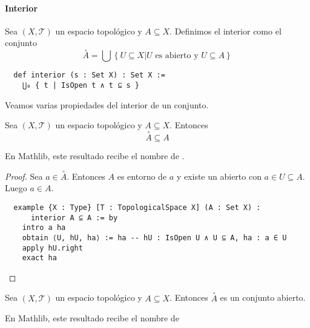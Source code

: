 \paragraph{Interior}

\begin{definition}
    Sea $(X, \mathcal{T})$ un espacio topológico y $A \subseteq X$. Definimos el \textnormal{interior} como el conjunto
    $$
    \overset{\circ}{A} = \bigcup \left\{ U \subseteq X | U \text{ es abierto y } U \subseteq A \right\}
    $$
\end{definition}

\begin{lstlisting}
  def interior (s : Set X) : Set X :=
    ⋃₀ { t | IsOpen t ∧ t ⊆ s }
\end{lstlisting}

Veamos varias propiedades del interior de un conjunto.

\begin{proposition}
  Sea $(X, \mathcal{T})$ un espacio topológico y $A \subseteq X$. Entonces
  $$
  \overset{\circ}{A} \subseteq A
  $$
\end{proposition}

En Mathlib, este resultado recibe el nombre de .

\begin{proof}
  Sea $a \in \overset{\circ}{A}$. Entonces $A$ es entorno de $a$ y existe un abierto con $a \in U \subseteq A$. Luego $a \in A$.

  \begin{lstlisting}
  example {X : Type} [T : TopologicalSpace X] (A : Set X) :
      interior A ⊆ A := by
    intro a ha
    obtain ⟨U, hU, ha⟩ := ha -- hU : IsOpen U ∧ U ⊆ A, ha : a ∈ U
    apply hU.right
    exact ha \end{lstlisting}
\end{proof}

\begin{proposition}
    Sea $(X, \mathcal{T})$ un espacio topológico y $A \subseteq X$. Entonces $\overset{\circ}{A}$ es un conjunto abierto.
\end{proposition}

En Mathlib, este resultado recibe el nombre de 

